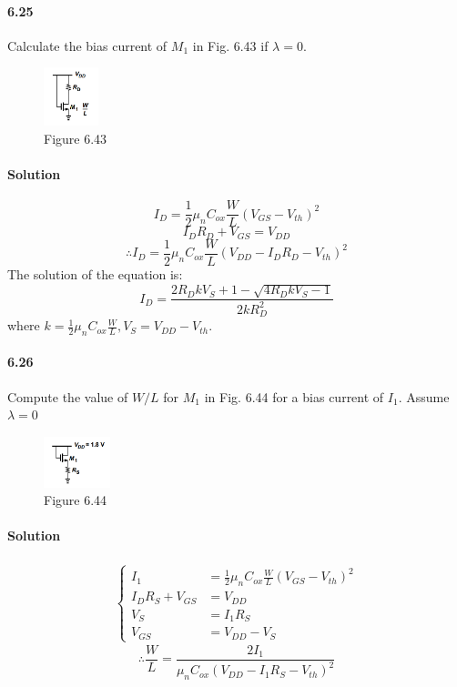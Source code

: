 \documentclass[hyperref, UTF8]{ctexart}
\begin{document}
\paragraph{6.25}
Calculate the bias current of $ M_1$ in Fig. 6.43 if $\lambda = 0$.

\begin{figure}[!htb]
    \centering
    \includegraphics[width=0.142\textwidth]{f6-43.png}
    \caption*{Figure 6.43}
\end{figure}   

\paragraph{Solution}
$$I_D = \frac{1}{2} \mu_n C_{ox} \frac{W}{L}(V_{GS}-V_{th})^2$$
$$I_DR_D + V_{GS} = V_{DD}$$
$$\therefore I_D = \frac{1}{2} \mu_n C_{ox} \frac{W}{L}(V_{DD}-I_DR_D-V_{th})^2$$
The solution of the equation is: 
$$I_D =\frac{2R_DkV_S + 1 - \sqrt{4R_DkV_S-1}}{2kR_D^2}$$
where $k = \frac{1}{2}\mu_nC_{ox}\frac{W}{L}, V_S = V_{DD} - V_{th}$.

\paragraph{6.26}
Compute the value of $W/L$ for $M_1$ in Fig. 6.44 for a bias current of $I_1$. Assume $\lambda = 0$

\begin{figure}[!htb]
    \centering
    \includegraphics[width=0.173\textwidth]{f6-44.png}
    \caption*{Figure 6.44}
\end{figure}

\paragraph{Solution}
\begin{gather*}
\left\{ \begin{aligned}
    I_1 & =  \frac{1}{2} \mu_n C_{ox} \frac{W}{L}(V_{GS}-V_{th})^2 \\
    I_DR_S + V_{GS} & = V_{DD} \\
    V_S &= I_1R_S \\
    V_{GS} &= V_{DD} - V_S
\end{aligned} \right.
\end{gather*}
$$
\therefore \frac{W}{L} = \frac{2I_1}{\mu_n C_{ox} (V_{DD} - I_1R_S - V_{th})^2}
$$
\end{document}
